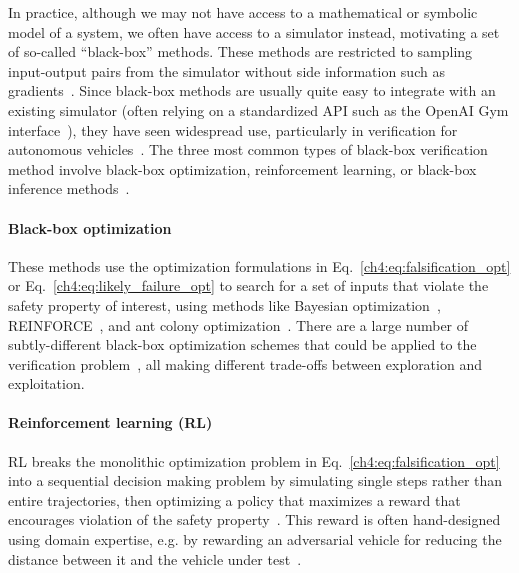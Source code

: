 In practice, although we may not have access to a mathematical or symbolic model of a system, we often have access to a simulator instead, motivating a set of so-called ``black-box'' methods. These methods are restricted to sampling input-output pairs from the simulator without side information such as gradients~\cite{corsoSurveyAlgorithmsBlackBox2021}. Since black-box methods are usually quite easy to integrate with an existing simulator (often relying on a standardized API such as the OpenAI Gym interface~\cite{brockmanOpenAIGym2016}), they have seen widespread use, particularly in verification for autonomous vehicles~\cite{xuSafeBenchBenchmarkingPlatform2022,riedmaierSurveyScenarioBasedSafety2020,okellyScalableEndtoEndAutonomous2018,corsoAdaptiveStressTesting2019,wangAdvSimGeneratingSafetyCritical2021,sunCornerCaseGeneration2021,zhongGuidedConditionalDiffusion2022,corsoInterpretableSafetyValidation2020a,zhangAdversarialRobustnessTrajectory2022}. The three most common types of black-box verification method involve black-box optimization, reinforcement learning, or black-box inference methods~\cite{corsoSurveyAlgorithmsBlackBox2021}.

\paragraph{Black-box optimization} These methods use the optimization formulations in Eq.~\eqref{ch4:eq:falsification_opt} or Eq.~\eqref{ch4:eq:likely_failure_opt} to search for a set of inputs that violate the safety property of interest, using methods like Bayesian optimization~\cite{wangAdvSimGeneratingSafetyCritical2021}, REINFORCE~\cite{dingLearningCollideAdaptive2020a}, and ant colony optimization~\cite{annpureddySTaLiRoToolTemporal2011}. There are a large number of subtly-different black-box optimization schemes that could be applied to the verification problem~\cite{kochenderfer_wheeler_2019}, all making different trade-offs between exploration and exploitation.

\paragraph{Reinforcement learning (RL)} RL breaks the monolithic optimization problem in Eq.~\eqref{ch4:eq:falsification_opt} into a sequential decision making problem by simulating single steps rather than entire trajectories, then optimizing a policy that maximizes a reward that encourages violation of the safety property~\cite{corsoAdaptiveStressTesting2019}. This reward is often hand-designed using domain expertise, e.g. by rewarding an adversarial vehicle for reducing the distance between it and the vehicle under test~\cite{dingLearningCollideAdaptive2020a}.

